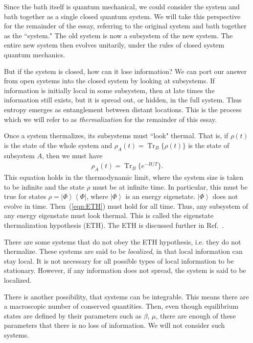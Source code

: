 \documentclass[a4paper,11pt]{article}
\newcommand{\ket}[1]{\left|#1\right\rangle}
\newcommand{\bra}[1]{\left\langle#1\right|}
\DeclareMathOperator{\Tr}{Tr}
\begin{document}
Since the bath itself is quantum mechanical, we could consider the system and bath together as a single closed quantum system. We will take this perspective for the remainder of the essay, referring to the original system and bath together as the ``system." The old system is now a subsystem of the new system. The entire new system then evolves unitarily, under the rules of closed system quantum mechanics.

But if the system is closed, how can it lose information? We can port our answer from open systems into the closed system by looking at subsystems. If information is initially local in some subsystem, then at late times the information still exists, but it is spread out, or hidden, in the full system. Thus entropy emerges as entanglement between distant locations. This is the process which we will refer to as \emph{thermalization} for the remainder of this essay.

Once a system thermalizes, its subsystems must ``look" thermal. That is, if $\rho(t)$ is the state of the whole system and $\rho_A(t)=\Tr_B\{\rho(t)\}$ is the state of subsystem $A$, then we must have
\begin{align}
\rho_A(t) = \Tr_B\{e^{-H/T}\}. \label{eqn:ETH}
\end{align}
This equation holds in the thermodynamic limit, where the system size is taken to be infinite and the state $\rho$ must be at infinite time. In particular, this must be true for states $\rho=\ket{\Phi}\bra{\Phi}$, where $\ket{\Phi}$ is an energy eigenstate. $\ket{\Phi}$ does not evolve in time. Then~(\ref{eqn:ETH}) must hold for all time. Thus, any subsystem of any energy eigenstate must look thermal. This is called the eigenstate thermalization hypothesis (ETH). The ETH is discussed further in Ref.~\cite{Nandkishore14}.

There are some systems that do not obey the ETH hypothesis, i.e. they do not thermalize. These systems are said to be \emph{localized}, in that local information can stay local. It is not necessary for all possible types of local information to be stationary. However, if any information does not spread, the system is said to be localized.

There is another possibility, that systems can be integrable. This means there are a macroscopic number of conserved quantities. Then, even though equilibrium states are defined by their parameters such as $\beta$, $\mu$, there are enough of these parameters that there is no loss of information. We will not consider such systems.
\end{document}
